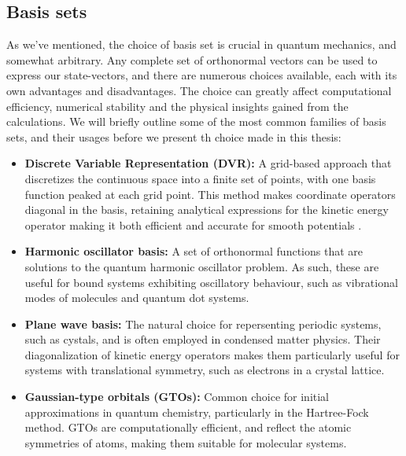 \documentclass{subfiles}
\begin{document}
\subsection{Basis sets}\label{sec:basis_set}
As we've mentioned, the choice of basis set is crucial in quantum mechanics, and somewhat arbitrary. Any complete set of orthonormal vectors can be used to express our state-vectors, and there are numerous choices available, each with its own advantages and disadvantages. The choice can greatly affect computational efficiency, numerical stability and the physical insights gained from the calculations. We will briefly outline some of the most common families of basis sets, and their usages before we present th choice made in this thesis:
\begin{itemize}
    \item \textbf{Discrete Variable Representation (DVR):} A grid-based approach that discretizes the continuous space into a finite set of points, with one basis function peaked at each grid point. This method makes coordinate operators diagonal in the basis, retaining analytical expressions for the kinetic energy operator making it both efficient and accurate for smooth potentials \cite{light1985generalized}. 
    \item \textbf{Harmonic oscillator basis:} A set of orthonormal functions that are solutions to the quantum harmonic oscillator problem. As such, these are useful for bound systems exhibiting oscillatory behaviour, such as vibrational modes of molecules and quantum dot systems.
    \item \textbf{Plane wave basis:} The natural choice for repersenting periodic systems, such as cystals, and is often employed in condensed matter physics. Their diagonalization of kinetic energy operators makes them particularly useful for systems with translational symmetry, such as electrons in a crystal lattice. \cite{kittel2018introduction}
    \item \textbf{Gaussian-type orbitals (GTOs):} Common choice for initial approximations in quantum chemistry, particularly in the Hartree-Fock method. GTOs are computationally efficient, and reflect the atomic symmetries of atoms, making them suitable for molecular systems. \cite{szabo1996modern}
\end{itemize}
\end{document}
